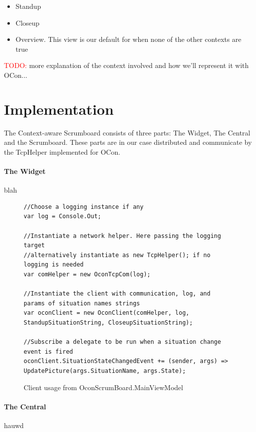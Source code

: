 \documentclass[]{report}
\newcommand\todo[1]{\textcolor{red}{TODO: }#1\PackageWarning{TODO:}{TODO tag!!}}
\begin{document}
\begin{itemize}
\item Standup
\item Closeup
\item Overview. This view is our default for when none of the other contexts are true
\end{itemize}


\todo{more explanation of the context involved and how we'll represent it with OCon...}



\section{Implementation}

The Context-aware Scrumboard consists of three parts: The Widget, The Central and the Scrumboard. These parts are in our case distributed and communicate by the TcpHelper implemented for OCon.


\paragraph{The Widget} blah\\

\begin{figure}[B]
\begin{lstlisting}
//Choose a logging instance if any
var log = Console.Out;

//Instantiate a network helper. Here passing the logging target
//alternatively instantiate as new TcpHelper(); if no logging is needed
var comHelper = new OconTcpCom(log);

//Instantiate the client with communication, log, and params of situation names strings
var oconClient = new OconClient(comHelper, log, StandupSituationString, CloseupSituationString);

//Subscribe a delegate to be run when a situation change event is fired
oconClient.SituationStateChangedEvent += (sender, args) => UpdatePicture(args.SituationName, args.State);
\end{lstlisting}
\caption{Client usage from OconScrumBoard.MainViewModel}
\label{code:OconWidget}
\end{figure}


\paragraph{The Central} hauwd
\end{document}
